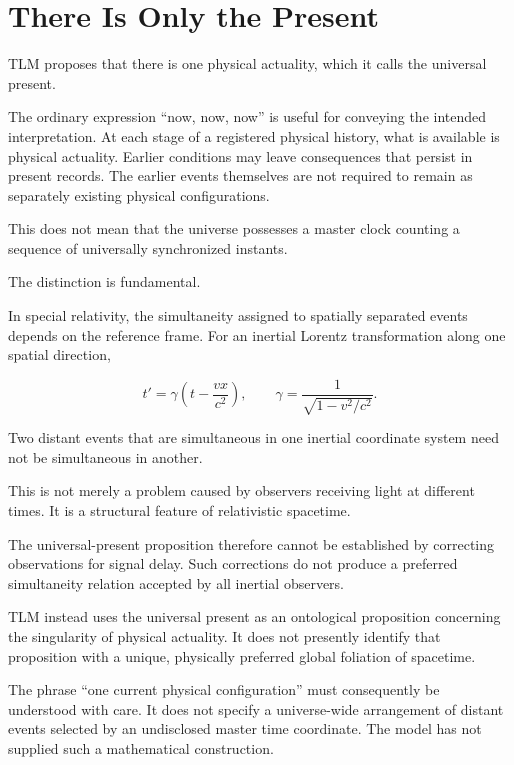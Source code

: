 \documentclass[12pt,onecolumn]{article}
\begin{document}
\section{There Is Only the Present}

TLM proposes that there is one physical actuality, which it calls the universal present.

The ordinary expression ``now, now, now'' is useful for conveying the intended interpretation. At each stage of a registered physical history, what is available is physical actuality. Earlier conditions may leave consequences that persist in present records. The earlier events themselves are not required to remain as separately existing physical configurations.

This does not mean that the universe possesses a master clock counting a sequence of universally synchronized instants.

The distinction is fundamental.

In special relativity, the simultaneity assigned to spatially separated events depends on the reference frame. For an inertial Lorentz transformation along one spatial direction,

\begin{equation}
t'=\gamma\left(t-\frac{vx}{c^2}\right),
\qquad
\gamma=\frac{1}{\sqrt{1-v^2/c^2}}.
\end{equation}

Two distant events that are simultaneous in one inertial coordinate system need not be simultaneous in another.

This is not merely a problem caused by observers receiving light at different times. It is a structural feature of relativistic spacetime.

The universal-present proposition therefore cannot be established by correcting observations for signal delay. Such corrections do not produce a preferred simultaneity relation accepted by all inertial observers.

TLM instead uses the universal present as an ontological proposition concerning the singularity of physical actuality. It does not presently identify that proposition with a unique, physically preferred global foliation of spacetime.

The phrase ``one current physical configuration'' must consequently be understood with care. It does not specify a universe-wide arrangement of distant events selected by an undisclosed master time coordinate. The model has not supplied such a mathematical construction.
\end{document}
